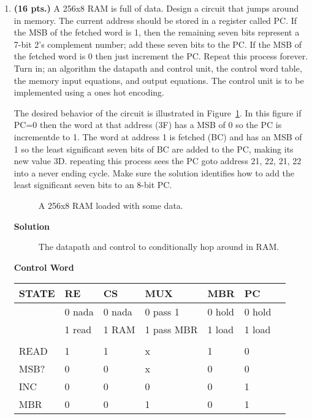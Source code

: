 \begin{enumerate}
\item \textbf{ (16 pts.)}
A 256x8 RAM is full of data.  Design a circuit that jumps 
around in memory.   The current address should be stored in a
register called PC.  If the MSB of the fetched word is 1, then the 
remaining seven bits represent a 7-bit 2's complement number;  add these 
seven bits to the PC.  If the MSB of the fetched word is 0 then just 
increment the PC.  Repeat this process forever.
Turn in; an algorithm the datapath and control unit, the control word 
table, the memory input equations, and output equations.  
The control unit is to be implemented using a ones hot encoding.

The desired behavior of the circuit is illustrated in 
Figure~\ref{fig:RAMhopper2}.  In this figure if PC=0 then the word at
that address (3F) has a MSB of 0 so the PC is incrementde to 1. The
word at address 1 is fetched (BC) and has an MSB of 1 so the least
significant seven bits of BC are added to the PC, making its new value
3D.  repeating this process sees the PC goto address 21, 22, 21, 22
into a never ending cycle.   Make sure the solution identifies how
to add the least significant seven bits to an 8-bit PC.

\begin{figure}[ht]
\caption{A 256x8 RAM loaded with some data.}
\label{fig:RAMhopper2}
\end{figure}

\begin{onlysolution}  \textbf{Solution} \itshape{

\begin{figure}[ht]
\caption{The datapath and control to conditionally hop around
in RAM.}
\end{figure}


\textbf{ Control Word}

\begin{tabular}{l|l|l|l|l|l|l}
STATE & RE     & CS     &MUX          &MBR    & PC	\\ \hline
      & 0 nada & 0 nada &0 pass 1     &0 hold &0 hold	\\ \hline
      & 1 read & 1 RAM  &1 pass MBR   &1 load &1 load	\\ \hline
      &        &        &             &       &       	\\ \hline
READ  & 1      & 1      & x           & 1     & 0	\\ \hline
MSB?  & 0      & 0      & x           & 0     & 0	\\ \hline
INC   & 0      & 0      & 0           & 0     & 1	\\ \hline
MBR   & 0      & 0      & 1           & 0     & 1	\\ \hline
\end{tabular}

}
\end{onlysolution}
\end{enumerate}
